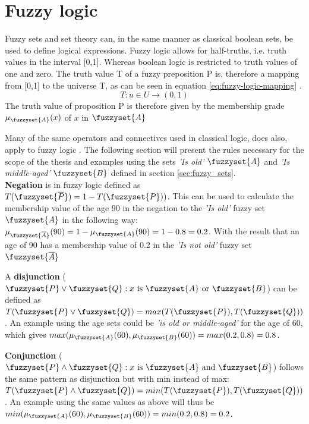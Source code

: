 \section{Fuzzy logic}
\label{section:fuzzy_logic}
Fuzzy sets and set theory can, in the same manner as classical boolean sets, be used to define logical expressions. Fuzzy logic allows for half-truths, i.e. truth values in the interval [0,1]. Whereas boolean logic is restricted to truth values of one and zero. The truth value T of a fuzzy preposition P is, therefore a mapping from [0,1] to the universe T, as can be seen in equation \ref{eq:fuzzy-logic-mapping} \cite{ross2009fuzzy}.
\begin{equation}
    T:u\in U\rightarrow (0,1)
    \label{eq:fuzzy-logic-mapping}
\end{equation}
The truth value of proposition P is therefore given by the membership grade $\mu_{\fuzzyset{A}}(x)$ of $x$ in $\fuzzyset{A}$

Many of the same operators and connectives used in classical logic, does also, apply to fuzzy logic \cite{ross2009fuzzy}.
The following section will present the rules  necessary for the scope of the thesis and examples using the sets \textit{'Is old'} $\fuzzyset{A}$ and \textit{'Is middle-aged'} $\fuzzyset{B}$  defined in section \ref{sec:fuzzy_sets}.\\

\textbf{Negation} is in fuzzy logic defined as $ T(\fuzzyset{\overline{P}})=1-T(\fuzzyset{P}))$. This can be used to calculate the membership value of the age 90 in the negation to the \textit{'Is old'}  fuzzy set $\fuzzyset{A}$ in the following way:
$\mu_{\fuzzyset{\overline{A}}}(90)=1-\mu_{\fuzzyset{A}}(90)=1-0.8=0.2$. With the result that an age of 90 has a membership value of 0.2 in the \textit{'Is not old'} fuzzy set $\fuzzyset{\overline{A}}$

A \textbf{disjunction} ($\fuzzyset{P}\lor \fuzzyset{Q}:x \text{ is } \fuzzyset{A} \text{ or } \fuzzyset{B}$)   can be defined as   $T(\fuzzyset{P} \lor \fuzzyset{Q}) = \\ max(T(\fuzzyset{P}),T(\fuzzyset{Q}))$. An example using the age sets could be \textit{'is old or middle-aged'} for the age of 60, which gives $max(\mu_{\fuzzyset{A}}(60),\mu_{\fuzzyset{B}}(60))=max(0.2,0.8)=0.8$.

\textbf{Conjunction} ($\fuzzyset{P}\land \fuzzyset{Q}:x \text{ is } \fuzzyset{A} \text{ and } \fuzzyset{B}$) follows the same pattern as disjunction but with min instead of max: $T(\fuzzyset{P} \land \fuzzyset{Q})=min(T(\fuzzyset{P}),T(\fuzzyset{Q}))$.
An example using the same values as above will thus be $min(\mu_{\fuzzyset{A}}(60),\mu_{\fuzzyset{B}}(60))=min(0.2,0.8)=0.2$.


